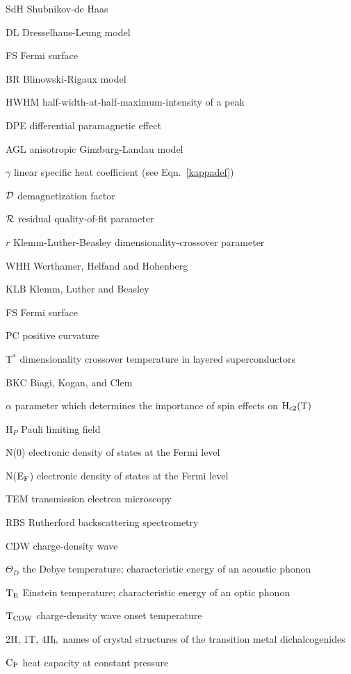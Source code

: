 \begin{list}{}{\setlength{\rightmargin}{\leftmargin}}
\item[SdH] Shubnikov-de Haas
\item[DL] Dresselhaus-Leung model\cite{F60}
\item[FS] Fermi surface
\item[BR] Blinowski-Rigaux model\cite{blinowski80}
\item[HWHM] half-width-at-half-maximum-intensity of a peak
\item[DPE] differential paramagnetic effect
\item[AGL] anisotropic Ginzburg-Landau model\cite{tilley65}
\item[$\gamma$] linear specific heat coefficient (see Eqn.~\ref{kappadef})
\item[$\cal D$] demagnetization factor
\item[$\cal R$] residual quality-of-fit parameter
\item[$r$] Klemm-Luther-Beasley dimensionality-crossover parameter\cite{klemm75}
\item[WHH] Werthamer, Helfand and Hohenberg\cite{werthamer66}
\item[KLB] Klemm, Luther and Beasley\cite{klemm75}
\item[FS]  Fermi surface
\item[PC]  positive curvature
\item[T$^*$] dimensionality crossover temperature in layered superconductors 
\item[BKC] Biagi, Kogan, and Clem\cite{biagi85}
\item[$\alpha$] parameter which de\-ter\-mines the im\-por\-tance of spin ef\-fects on $\rm H_{c2}(T)$ 
\item[H$_P$] Pauli limiting field
\item[N(0)] electronic density of states at the Fermi level
\item[N($\rm E_F$)] electronic density of states at the Fermi level
\item[TEM] transmission electron microscopy
\item[RBS] Rutherford backscattering spectrometry
\item[CDW] charge-density wave
\item[$\Theta_D$] the Debye temperature; characteristic energy of an acoustic phonon
\item[$\rm T_E$] Einstein temperature; characteristic energy of an optic phonon
\item[$\rm T_{CDW}$] charge-density wave onset temperature
\item[2H, 1T, 4H$\rm _{b}$] names of crys\-tal struc\-tures of the tran\-si\-tion metal di\-chal\-cog\-enides\cite{friend79}
\item[$\rm C_P$] heat capacity at constant pressure
\end{list}
\clearpage


